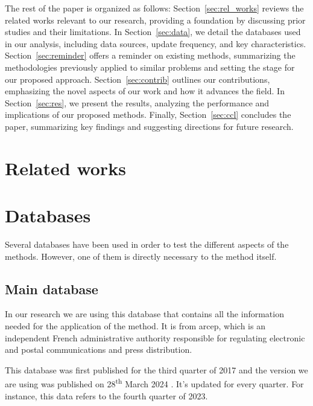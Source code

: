 \documentclass[lettersize,journal,english]{IEEEtran}
\begin{document}
    The rest of the paper is organized as follows: Section~\ref{sec:rel_works} reviews the related works relevant to our research, providing a foundation by discussing prior studies and their limitations. In Section~\ref{sec:data}, we detail the databases used in our analysis, including data sources, update frequency, and key characteristics. Section~\ref{sec:reminder} offers a reminder on existing methods, summarizing the methodologies previously applied to similar problems and setting the stage for our proposed approach. Section~\ref{sec:contrib} outlines our contributions, emphasizing the novel aspects of our work and how it advances the field. In Section~\ref{sec:res}, we present the results, analyzing the performance and implications of our proposed methods. Finally, Section~\ref{sec:ccl} concludes the paper, summarizing key findings and suggesting directions for future research.

\section{Related works\label{sec:rel_works}}
    \noindent

\section{Databases\label{sec:data}}
    \noindent Several databases have been used in order to test the different aspects of the methods. However, one of them is directly necessary to the method itself.

    \subsection{Main database}
        In our research we are using this database \cite{main_database} that contains all the information needed for the application of the method. It is from \acrfull{arcep}, which is an independent French administrative authority responsible for regulating electronic and postal communications and press distribution.

        This database was first published for the third quarter of 2017 and the version we are using was published on 28\textsuperscript{th} March 2024 \cite{main_database_hist}.
        It's updated for every quarter. For instance, this data refers to the fourth quarter of 2023.
\end{document}
